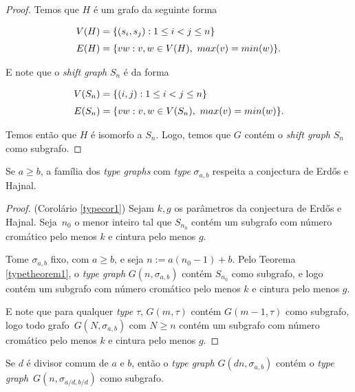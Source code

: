 \begin{proof}
Temos que $H$ é um grafo da seguinte forma

\begin{equation*}
\setlength{\jot}{6pt}
\begin{aligned}
V(H) &= \{(s_i,s_j) : 1\leq i<j\leq n\}\\
E(H) &= \{vw : v,w\in V(H),\ max(v) = min(w)\}.
\end{aligned}
\end{equation*}

E note que o \textit{shift graph} $S_n$ é da forma

\begin{equation*}
\setlength{\jot}{6pt}
\begin{aligned}
V(S_n) &= \{(i,j) : 1\leq i<j\leq n\}\\
E(S_n) &= \{vw : v,w\in V(S_n),\ max(v) = min(w)\}.
\end{aligned}
\end{equation*}

Temos então que $H$ é isomorfo a $S_n$. Logo, temos que $G$ contém o \textit{shift graph} $S_n$ como subgrafo.
\end{proof}

\begin{corolario}\label{typecor1}
Se $a\geq b$, a família dos \textit{type graphs} com \textit{type} $\sigma_{a,b}$ respeita a conjectura de Erd\H{o}s e Hajnal.
\end{corolario}

\begin{proof}(Corolário \ref{typecor1})
Sejam $k,g$ os parâmetros da conjectura de Erd\H{o}s e Hajnal. Seja~$n_0$ o menor inteiro tal que $S_{n_0}$ contém um subgrafo com número cromático pelo menos $k$ e cintura pelo menos $g$.

Tome $\sigma_{a,b}$ fixo, com $a\geq b$, e seja $n := a(n_0-1)+b$. Pelo Teorema \ref{typetheorem1}, o \textit{type graph} $G(n,\sigma_{a,b})$ contém $S_{n_0}$ como subgrafo, e logo contém um subgrafo com número cromático pelo menos $k$ e cintura pelo menos $g$.

E note que para qualquer \textit{type} $\tau$, $G(m,\tau)$ contém $G(m-1,\tau)$ como subgrafo, logo todo grafo~$G(N,\sigma_{a,b})$ com $N \geq n$ contém um subgrafo com número cromático pelo menos $k$ e cintura pelo menos $g$.
\end{proof}

\begin{teorema}\label{typetheorem2}
Se $d$ é divisor comum de $a$ e $b$, então o \textit{type graph} $G(dn,\sigma_{a,b})$ contém o \textit{type graph}~$G(n,\sigma_{a/d,b/d})$ como subgrafo.
\end{teorema}

